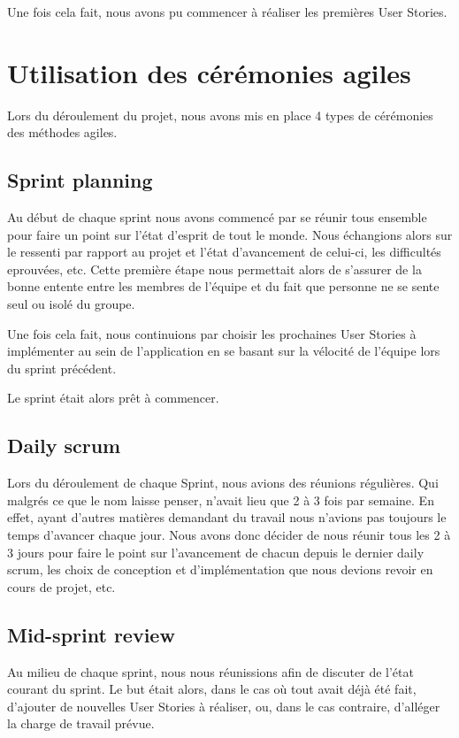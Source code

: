\documentclass[11pt]{report}
\begin{document}
Une fois cela fait, nous avons pu commencer à réaliser les premières User Stories.

\section{Utilisation des cérémonies agiles}

Lors du déroulement du projet, nous avons mis en place 4 types de cérémonies des méthodes agiles.

\subsection{Sprint planning}

Au début de chaque sprint nous avons commencé par se réunir tous ensemble pour faire un point sur l'état d'esprit de tout le monde.
Nous échangions alors sur le ressenti par rapport au projet et l'état d'avancement de celui-ci, les difficultés eprouvées, etc. Cette première étape
nous permettait alors de s'assurer de la bonne entente entre les membres de l'équipe et du fait que personne ne se sente seul ou isolé du groupe.

Une fois cela fait, nous continuions par choisir les prochaines User Stories à implémenter au sein de l'application en se basant sur la vélocité
de l'équipe lors du sprint précédent.\newline

Le sprint était alors prêt à commencer.

\subsection{Daily scrum}

Lors du déroulement de chaque Sprint, nous avions des réunions régulières. Qui malgrés ce que le nom
laisse penser, n'avait lieu que 2 à 3 fois par semaine. En effet, ayant d'autres matières demandant du travail
nous n'avions pas toujours le temps d'avancer chaque jour. Nous avons donc décider de nous réunir tous les 2 à 3 jours
pour faire le point sur l'avancement de chacun depuis le dernier daily scrum, les choix de conception et d'implémentation que
nous devions revoir en cours de projet, etc.

\subsection{Mid-sprint review}

Au milieu de chaque sprint, nous nous réunissions afin de discuter de l'état courant du sprint. Le but était alors, dans le cas
où tout avait déjà été fait, d'ajouter de nouvelles User Stories à réaliser, ou, dans le cas contraire, d'alléger la charge
de travail prévue.
\end{document}
